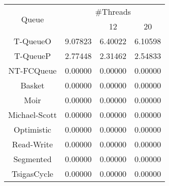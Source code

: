 \begin{tabular}{|c|c|c|c|}
\hline
\multirow{2}{*}{Queue} & \multicolumn{3}{c|}{\#Threads}\\\cline{2-4}& \quad 4 & 12 & 20\\
\hline
\hline
T-QueueO & 9.07823 & 6.40022 & 6.10598\\
T-QueueP & 2.77448 & 2.31462 & 2.54833\\
NT-FCQueue & 0.00000 & 0.00000 & 0.00000\\
Basket & 0.00000 & 0.00000 & 0.00000\\
Moir & 0.00000 & 0.00000 & 0.00000\\
Michael-Scott & 0.00000 & 0.00000 & 0.00000\\
Optimistic & 0.00000 & 0.00000 & 0.00000\\
Read-Write & 0.00000 & 0.00000 & 0.00000\\
Segmented & 0.00000 & 0.00000 & 0.00000\\
TsigasCycle & 0.00000 & 0.00000 & 0.00000\\
\hline\end{tabular}
